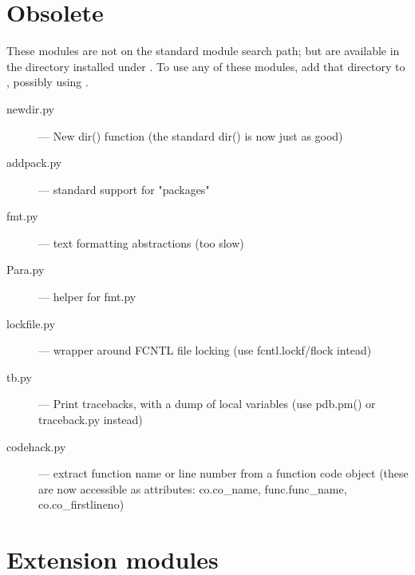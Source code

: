 \section{Obsolete}

These modules are not on the standard module search path;
but are available in the directory  installed  under
.  To use any of these
modules, add that directory to , possibly using
.

\begin{description}
\item[newdir.py]
--- New dir() function (the standard dir() is now just as good)

\item[addpack.py]
--- standard support for "packages"

\item[fmt.py]
--- text formatting abstractions (too slow)

\item[Para.py]
--- helper for fmt.py

\item[lockfile.py]
--- wrapper around FCNTL file locking (use
fcntl.lockf/flock intead)

\item[tb.py]
--- Print tracebacks, with a dump of local variables (use
pdb.pm() or traceback.py instead)

\item[codehack.py]
--- extract function name or line number from a function
code object (these are now accessible as attributes: co.co_name,
func.func_name, co.co_firstlineno)
\end{description}


\section{Extension modules}

